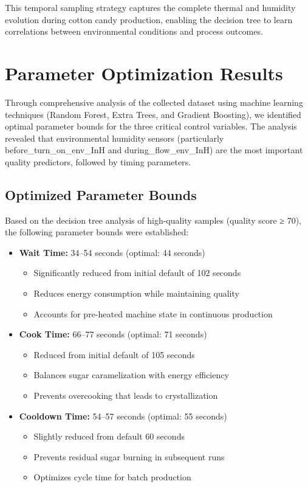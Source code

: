 This temporal sampling strategy captures the complete thermal and humidity evolution during cotton candy production, enabling the decision tree to learn correlations between environmental conditions and process outcomes.

\section{Parameter Optimization Results}
\label{sec:parameter-optimization}

Through comprehensive analysis of the collected dataset using machine learning techniques (Random Forest, Extra Trees, and Gradient Boosting), we identified optimal parameter bounds for the three critical control variables. The analysis revealed that environmental humidity sensors (particularly before_turn_on_env_InH and during_flow_env_InH) are the most important quality predictors, followed by timing parameters.

\subsection{Optimized Parameter Bounds}

Based on the decision tree analysis of high-quality samples (quality score ≥ 70), the following parameter bounds were established:

\begin{itemize}
    \item \textbf{Wait Time:} 34--54 seconds (optimal: 44 seconds)
    \begin{itemize}
        \item Significantly reduced from initial default of 102 seconds
        \item Reduces energy consumption while maintaining quality
        \item Accounts for pre-heated machine state in continuous production
    \end{itemize}
    
    \item \textbf{Cook Time:} 66--77 seconds (optimal: 71 seconds)
    \begin{itemize}
        \item Reduced from initial default of 105 seconds
        \item Balances sugar caramelization with energy efficiency
        \item Prevents overcooking that leads to crystallization
    \end{itemize}
    
    \item \textbf{Cooldown Time:} 54--57 seconds (optimal: 55 seconds)
    \begin{itemize}
        \item Slightly reduced from default 60 seconds
        \item Prevents residual sugar burning in subsequent runs
        \item Optimizes cycle time for batch production
    \end{itemize}
\end{itemize}

